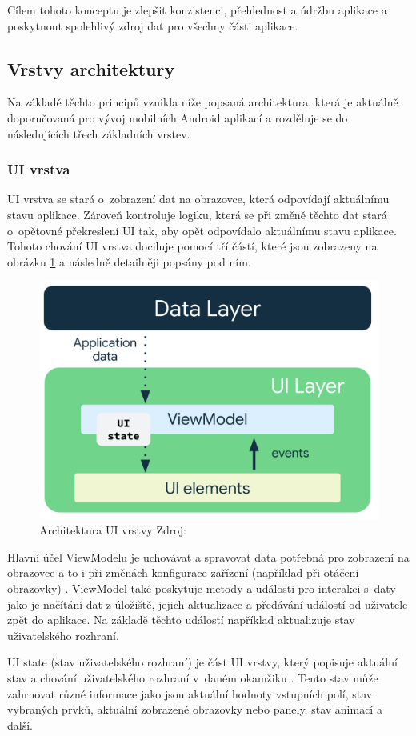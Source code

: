 Cílem tohoto konceptu je zlepšit konzistenci, přehlednost a údržbu aplikace a poskytnout spolehlivý zdroj dat pro všechny části aplikace.


\subsection*{Vrstvy architektury} \label{vrstvyArchitekturySection} 
Na základě těchto principů vznikla níže popsaná architektura, která je aktuálně doporučovaná pro vývoj mobilních Android aplikací 
a rozděluje se do následujících třech základních vrstev.

\subsubsection*{UI vrstva} \label{UILayerNavrh}
UI vrstva se stará o~zobrazení dat na obrazovce, která odpovídají aktuálnímu stavu aplikace. \cite{andDocArch} Zároveň kontroluje logiku, která
se při změně těchto dat stará o~opětovné překreslení UI tak, aby opět odpovídalo aktuálnímu stavu aplikace. Tohoto chování UI vrstva 
dociluje pomocí tří částí, které jsou zobrazeny na obrázku \ref{fig:arch_ui_udf} a následně detailněji popsány pod ním.

\begin{figure}[H]
  \centering
  \includegraphics[width=.5\textwidth]{arch-ui-udf.png}
  \caption{Architektura UI vrstvy Zdroj: \cite{imgDataFlow}}
  \label{fig:arch_ui_udf}
\end{figure}

Hlavní účel ViewModelu je uchovávat a spravovat data potřebná pro zobrazení na obrazovce a to i při změnách konfigurace zařízení 
(například při otáčení obrazovky) \cite{viewModelOver}. ViewModel také poskytuje metody a události pro interakci s~daty jako je načítání dat z úložiště, 
jejich aktualizace a předávání událostí od uživatele zpět do aplikace. Na základě těchto událostí například aktualizuje stav uživatelského
rozhraní. %

 \label{UIStateParagraph}
UI state (stav uživatelského rozhraní) je část UI vrstvy, který popisuje aktuální stav a chování uživatelského 
rozhraní v~daném okamžiku \cite{andDocArch}. Tento stav může zahrnovat různé informace jako jsou aktuální hodnoty vstupních polí, stav vybraných prvků,
 aktuální zobrazené obrazovky nebo panely, stav animací a další.

